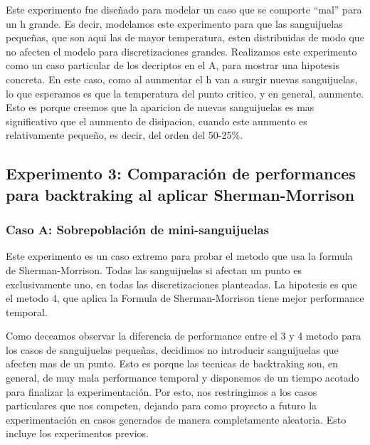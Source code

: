 Este experimento fue dise\~nado para modelar un caso que se comporte ``mal'' para un 
h grande. Es decir, modelamos este experimento para que 
las sanguijuelas peque\~nas, que son aqui las de mayor temperatura, esten
distribuidas de modo que no afecten el
modelo para discretizaciones grandes. 
Realizamos este experimento como un caso particular de los decriptos en el A, para mostrar una 
hipotesis concreta. En este caso, como al aunmentar el h van a surgir nuevas sanguijuelas, lo
que esperamos es que la temperatura del punto critico, y en general, aunmente. Esto es porque creemos
que la aparicion de nuevas sanguijuelas es mas significativo que el aunmento de disipacion, cuando este
aunmento es relativamente peque\~no, es decir, del orden del 50-25\%.


\subsection{Experimento 3: Comparaci\'on de performances para backtraking al aplicar Sherman-Morrison}

\subsubsection{Caso A: Sobrepoblaci\'on de mini-sanguijuelas}

Este experimento es un caso extremo para probar el metodo que usa la 
formula de Sherman-Morrison. Todas las 
sanguijuelas si afectan un punto es exclusivamente uno,
en todas las discretizaciones planteadas. La hipotesis es que el metodo 4, que
aplica la Formula de Sherman-Morrison tiene mejor performance temporal.

Como deceamos observar la diferencia de performance entre el 3 y 4 metodo
para los casos de sanguijuelas peque\~nas, decidimos no introducir sanguijuelas que afecten mas de un punto.
Esto es porque las tecnicas de backtraking son, en general, de muy mala performance temporal y disponemos
de un tiempo acotado para finalizar la experimentaci\'on. Por esto, nos restringimos a los casos 
particulares que nos competen, dejando para como proyecto a futuro la experimentaci\'on en casos
generados de manera completamente aleatoria. Esto incluye los experimentos previos.

